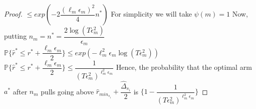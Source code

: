 \begin{proof}
$\leq exp(-2\dfrac{(\ell_{m}\epsilon_{m})^{2}}{4} n^{*})$
\newline For simplicity we will take $\psi(m)=1$
\newline Now, putting $n_{m}=n^{*}=\dfrac{2\log (T\epsilon_{m}^{2})}{\epsilon_{m}}$
\newline$\mathbb{P}\lbrace\hat{r}^{*}\leq{r}^{*} +  \dfrac{\ell_{m}\epsilon_{m}}{2}\rbrace\leq exp(-\ell_{m}^{2}\epsilon_{m} \log(T\epsilon_{m}^{2}))$
\newline $\mathbb{P}\lbrace\hat{r}^{*}\leq{r}^{*} +  \dfrac{\ell_{m}\epsilon_{m}}{2}\rbrace\leq \dfrac{1}{(T\epsilon_{m}^{2})^{\ell_{m}^{2}\epsilon_{m}}}$
\newline
Hence, the probability that the optimal arm $a^{*}$ after $n_{m}$ pulls going above $\hat{r}_{min_{s_{i}}}+\dfrac{\hat{\Delta}_{s_{i}}}{2}$ is $\bigg\lbrace 1- \dfrac{1}{(T\epsilon_{m}^{2})^{\ell_{m}^{2}\epsilon_{m}}} \bigg\rbrace$

\end{proof}

